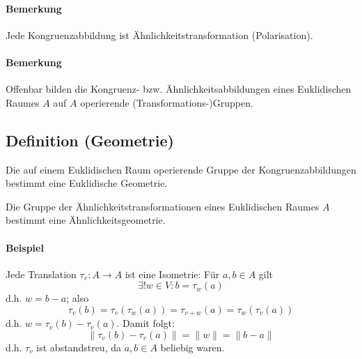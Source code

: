\paragraph{Bemerkung}
	Jede Kongruenzabbildung ist Ähnlichkeitstransformation (Polarisation).
\paragraph{Bemerkung}
	Offenbar bilden die Kongruenz- bzw. Ähnlichkeitsabbildungen eines Euklidischen Raumes $ A $ auf $ A $ operierende (Transformations-)Gruppen.
	
\subsection{Definition (Geometrie)}
\begin{Definition}
	Die auf einem Euklidischen Raum operierende Gruppe der Kongruenzabbildungen bestimmt eine Euklidische Geometrie.
	
	Die Gruppe der Ähnlichkeitstransformationen eines Euklidischen Raumes $ A $ bestimmt eine Ähnlichkeitsgeometrie.
\end{Definition}


\paragraph{Beispiel}
Jede Translation $ \tau_v:A\to A $ ist eine Isometrie:
	Für $ a,b\in A $ gilt
		\[ \exists!w\in V: b=\tau_w(a) \]
	d.h. $ w=b-a $; also
		\[ \tau_v(b) = \tau_v(\tau_w(a)) = \tau_{v+w}(a) = \tau_w(\tau_v (a)) \]
	d.h. $ w = \tau_v(b)-\tau_v(a) $.
	Damit folgt:
	\[ \|\tau_v(b)-\tau_v(a)\| = \|w\| = \|b-a\| \]
	d.h. $ \tau_v $ ist abstandstreu, da $ a,b\in A $ beliebig waren.
	

	

